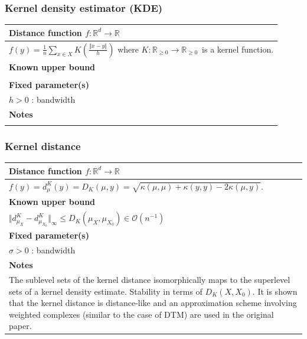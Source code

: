 \documentclass[10pt,a4paper]{article}
\theoremstyle{definition}
\newcommand{\R}{\mathbb{R}}
\begin{document}
\subsubsection{Kernel density estimator (KDE)}
\begin{tabularx}{\textwidth}{|X|}
	\hline
	\textbf{Distance function $f\colon\R^d\to\R$}  \\ \hline
	$f(y)=\frac{1}{n}\sum_{x\in X}K\left(\frac{\Vert x-y \Vert}{h}\right)$ where $K\colon\R_{\geq0}\to\R_{\geq0}$ is a kernel function.
	\\ \hline
	\textbf{Known upper bound}  \\ \hline

	\\ \hline
	\textbf{Fixed parameter(s)} \\ \hline
	$h>0$ : bandwidth
	\\ \hline
	\textbf{Notes}              \\ \hline
	\\ \hline
\end{tabularx}

\subsubsection{Kernel distance}
\begin{tabularx}{\textwidth}{|X|}
	\hline
	\textbf{Distance function $f\colon\R^d\to\R$}  \\ \hline
	$f(y)=d_{\mu}^K(y) = D_K(\mu, y) = \sqrt{\kappa(\mu,\mu)+\kappa(y,y)-2\kappa(\mu,y)}$.
	\\ \hline
	\textbf{Known upper bound}  \\ \hline
	$
	\Vert d^K_{\mu_X}-d^K_{\mu_{X_0}}\Vert_\infty \leq D_K(\mu_X, \mu_{X_0}) \in\mathcal{O}(n^{-1})
	$
	\\ \hline
	\textbf{Fixed parameter(s)} \\ \hline
	$\sigma>0$ : bandwidth
	\\ \hline
	\textbf{Notes}              \\ \hline
	The sublevel sets of the kernel distance isomorphically maps to the superlevel sets of a kernel density estimate. Stability in terms of $D_K(X, X_0)$. It is shown that the kernel distance is distance-like and an approximation scheme involving weighted complexes (similar to the case of DTM) are used in the original paper.
	\\ \hline
\end{tabularx}

\printbibliography
\end{document}
